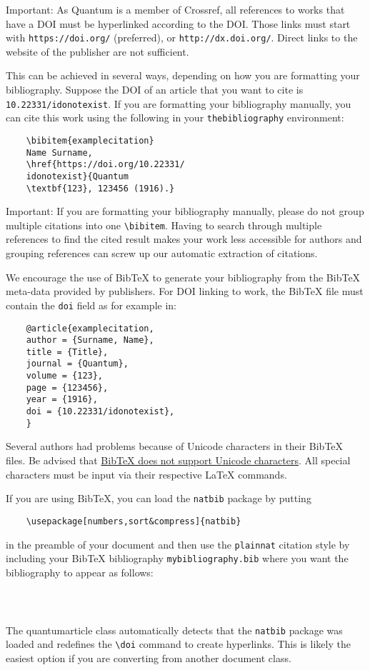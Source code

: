 \documentclass[a4paper,noarxiv,onecolumn]{quantumarticle}
\begin{document}
	\begin{theorem}
		Important: As Quantum is a member of Crossref, all references to works that have a DOI must be hyperlinked according to the DOI. Those links must start with \texttt{https://doi.org/} (preferred), or \texttt{http://dx.doi.org/}. Direct links to the website of the publisher are not sufficient.
	\end{theorem}
	
	This can be achieved in several ways, depending on how you are formatting your bibliography.
	Suppose the DOI of an article \cite{examplecitation} that you want to cite is \texttt{10.22331/idonotexist}.
	If you are formatting your bibliography manually, you can cite this work using the following in your \texttt{thebibliography} environment:
	\begin{verbatim}
	\bibitem{examplecitation}
	Name Surname,
	\href{https://doi.org/10.22331/
	idonotexist}{Quantum
	\textbf{123}, 123456 (1916).}
	\end{verbatim}
	
	\begin{theorem}
		Important: If you are formatting your bibliography manually, please do not group multiple citations into one \texttt{\textbackslash{}bibitem}.
		Having to search through multiple references to find the cited result makes your work less accessible for authors and grouping references can screw up our automatic extraction of citations.
	\end{theorem}
	
	We encourage the use of BibTeX to generate your bibliography from the BibTeX meta-data provided by publishers.
	For DOI linking to work, the BibTeX file must contain the \texttt{doi} field as for example in:
	\begin{verbatim}
	@article{examplecitation,
	author = {Surname, Name},
	title = {Title},
	journal = {Quantum},
	volume = {123},
	page = {123456},
	year = {1916},
	doi = {10.22331/idonotexist},
	}
	\end{verbatim}
	Several authors had problems because of Unicode characters in their BibTeX files.
	Be advised that \href{http://wiki.lyx.org/BibTeX/Tips}{BibTeX does not support Unicode characters}.
	All special characters must be input via their respective LaTeX commands.
	
	If you are using BibTeX, you can load the \texttt{natbib} package by putting
	\begin{verbatim}
	\usepackage[numbers,sort&compress]{natbib}
	\end{verbatim}
	in the preamble of your document and then use the \texttt{plainnat} citation style by including your BibTeX bibliography \texttt{mybibliography.bib} where you want the bibliography to appear as follows:
	\begin{verbatim}
	
	
	\end{verbatim}
	The quantumarticle class automatically detects that the \texttt{natbib} package was loaded and redefines the \texttt{\textbackslash{}doi} command to create hyperlinks.
	This is likely the easiest option if you are converting from another document class.
	
\end{document}
